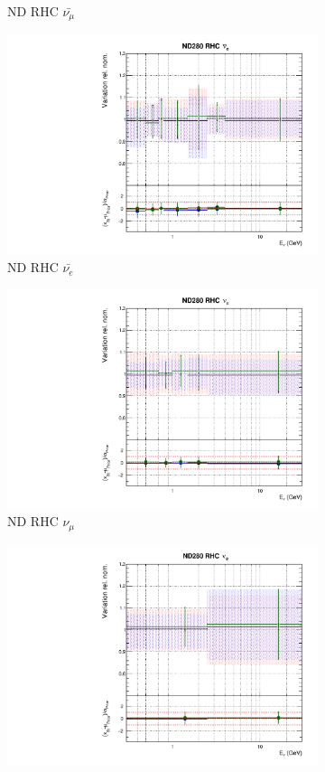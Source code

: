 \begin{figure}[t]
\begin{subfigure}{0.24\textwidth}
  \caption{ND RHC $\bar{\nu_{\mu}}$}
\end{subfigure}
\begin{subfigure}{0.24\textwidth}
  \centering
  \includegraphics[width=0.95\linewidth]{figs/hptpcfitsflux_5}
  \caption{ND RHC $\bar{\nu_{e}}$}
\end{subfigure}
\begin{subfigure}{0.24\textwidth}
  \centering
  \includegraphics[width=0.95\linewidth]{figs/hptpcfitsflux_6}
  \caption{ND RHC $\nu_{\mu}$}
\end{subfigure}
\vspace{15mm}
\begin{subfigure}{0.24\textwidth}
  \centering
  \includegraphics[width=0.95\linewidth]{figs/hptpcfitsflux_7}

\end{subfigure}
\end{figure}
